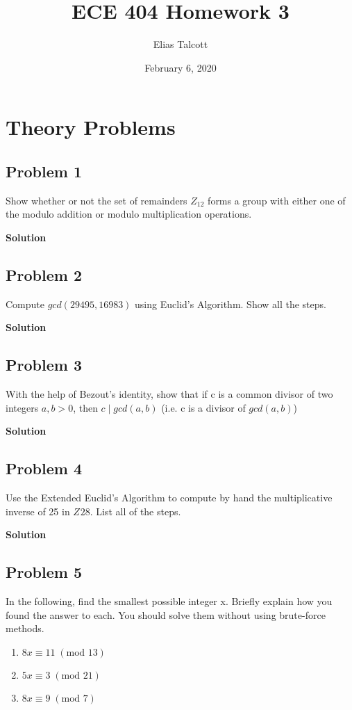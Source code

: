 \documentclass[11pt]{article}
\def \myTitle {ECE 404 Homework 3}
\def \myName {Elias Talcott}
\def \myDate {February 6, 2020}
\begin{document}
\begin{titlepage}
\title{\myTitle}
\author{\myName}
\date{\myDate}
\maketitle
\vspace{1in}
\tableofcontents
\thispagestyle{empty}
\end{titlepage}

\section{Theory Problems}

\subsection{Problem 1}
Show whether or not the set of remainders $Z_{12}$ forms a group with either one of the modulo addition or modulo multiplication operations.

\textbf{Solution}

\subsection{Problem 2}
Compute $gcd(29495, 16983)$ using Euclid's Algorithm. Show all the steps.

\textbf{Solution}

\subsection{Problem 3}
With the help of Bezout's identity, show that if c is a common divisor of two integers $a, b > 0$, then $c\; |\; gcd(a,b)$ (i.e. c is a divisor of $gcd(a,b)$)

\textbf{Solution}

\subsection{Problem 4}
Use the Extended Euclid's Algorithm to compute by hand the multiplicative inverse of 25 in $Z_{}28$. List all of the steps.

\textbf{Solution}

\subsection{Problem 5}
In the following, find the smallest possible integer x. Briefly explain how you found the answer to each. You should solve them without using brute-force methods.
\begin{enumerate}[label=(\alph*)]
\item $8x \equiv 11\; (\textrm{mod } 13)$
\item $5x \equiv 3\; (\textrm{mod } 21)$
\item $8x \equiv 9\; (\textrm{mod } 7)$
\end{enumerate}
\end{document}
